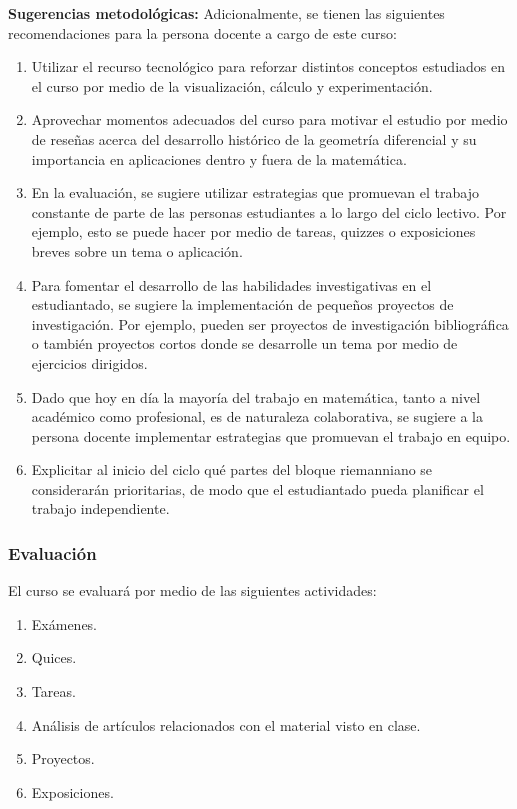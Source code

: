 \begin{refsection}
\textbf{Sugerencias metodológicas:} Adicionalmente, se tienen las siguientes recomendaciones para la persona docente a cargo de este curso:
\begin{enumerate}
    \item Utilizar el recurso tecnológico para reforzar distintos conceptos estudiados en el curso por medio de la visualización, cálculo y experimentación.
    \item Aprovechar momentos adecuados del curso para motivar el estudio por medio de reseñas acerca del desarrollo histórico de la geometría diferencial y su importancia en aplicaciones dentro y fuera de la matemática.
    \item En la evaluación, se sugiere utilizar estrategias que promuevan el trabajo constante de parte de las personas estudiantes a lo largo del ciclo lectivo. Por ejemplo, esto se puede hacer por medio de tareas, quizzes o exposiciones breves sobre un tema o aplicación.
    \item Para fomentar el desarrollo de las habilidades investigativas en el estudiantado, se sugiere la implementación de pequeños proyectos de investigación. Por ejemplo, pueden ser proyectos de investigación bibliográfica o también proyectos cortos donde se desarrolle un tema por medio de ejercicios dirigidos.
    \item Dado que hoy en día la mayoría del trabajo en matemática, tanto a nivel académico como profesional, es de naturaleza colaborativa, se sugiere a la persona docente implementar estrategias que promuevan el trabajo en equipo.
    \item Explicitar al inicio del ciclo qué partes del bloque riemanniano se considerarán prioritarias, de modo que el estudiantado pueda planificar el trabajo independiente.
\end{enumerate}

\subsubsection*{Evaluación}

El curso se evaluará por medio de las siguientes actividades:

\begin{enumerate}
\item Exámenes.
\item Quices.
\item Tareas.
\item Análisis de artículos relacionados con el material visto en clase.
\item Proyectos.
\item Exposiciones.
\end{enumerate}

\nocite{Tu11}
\nocite{Lee13}
\nocite{Tu17}
\nocite{DoC92}
\nocite{GP74}
\nocite{DoC16}
\nocite{Kuh15}
\nocite{ONeil06}

\printcursosbibliography
\end{refsection}
